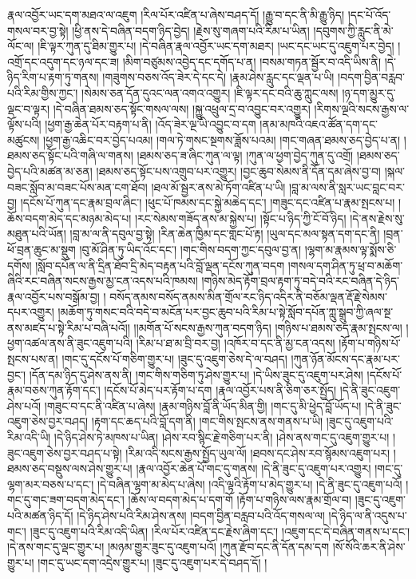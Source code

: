 རྣལ་འབྱོར་ཡང་དག་མཐའ་ལ་འཇུག །རིལ་པོར་འཛིན་པ་ཞེས་བཤད་དོ། །རྒྱུ་བ་དང་ནི་མི་རྒྱུ་ཉིད། །དང་པོ་འོད་གསལ་བར་བྱ་སྟེ། །ཕྱི་ནས་དེ་བཞིན་བདག་ཉིད་བྱེད། །རྗེས་སུ་གཞག་པའི་རིམ་པ་ཡིན། །དབུགས་ཀྱི་རླུང་ནི་མེ་ལོང་ལ། །ཇི་ལྟར་ཀུན་དུ་ཐིམ་གྱུར་པ། །དེ་བཞིན་རྣལ་འབྱོར་ཡང་དག་མཐར། །ཡང་དང་ཡང་དུ་འཇུག་པར་བྱེད། །འགྲོ་དང་འདུག་དང་ཉལ་དང་ཟ། །མིག་བཙུམས་འབྱེད་དང་དགོད་པ་ན། །བསམ་གཏན་སྦྱོར་བ་འདི་ཡིས་ནི། །དེ་ཉིད་རིག་པ་རྟག་ཏུ་གནས། །གཟུགས་བཅས་འོད་ཟེར་དེ་དང་དེ། །རྣམ་ཤེས་རླུང་དང་ལྡན་པ་ཡི། །བདག་བྱིན་བརླབ་པའི་རིམ་གྱིས་ཀྱང་། །སེམས་ཅན་དོན་དུའང་ལན་འགའ་འགྱུར། །ཇི་ལྟར་དང་བའི་ཆུ་ཀླུང་ལས། །ཉ་དག་མྱུར་དུ་ལྡང་བ་ལྟར། །དེ་བཞིན་ཐམས་ཅད་སྟོང་གསལ་ལས། །སྐྱུ་འཕྲུལ་དྲ་བ་འབྱུང་བར་འགྱུར། །རིགས་ལྔའི་སངས་རྒྱས་ལ་ལྟོས་པའི། །ཕྱག་རྒྱ་ཆེན་པོར་བརྟག་པ་ནི། །འོད་ཟེར་ལྔ་ཡི་འབྱུང་བ་དག །ནམ་མཁའི་འཇའ་ཚོན་དག་དང་མཚུངས། །ཕྱག་རྒྱ་འཆིང་བར་བྱེད་པའམ། །གལ་ཏེ་གསང་སྔགས་ཟློས་པའམ། །གང་གཞན་ཐམས་ཅད་བྱེད་པ་ན། །ཐམས་ཅད་སྟོང་པའི་གཞི་ལ་གནས། །ཐམས་ཅད་ཟ་ཞིང་ཀུན་ལ་ལྟ། །ཀུན་ལ་ཕྱག་བྱེད་ཀུན་དུ་འགྲོ། །ཐམས་ཅད་བྱེད་པའི་མཚན་མ་ཅན། །ཐམས་ཅད་སྟོང་པས་འགྲུབ་པར་འགྱུར། །བྱང་ཆུབ་སེམས་ནི་དོན་དམ་ཞེས་བྱ་བ། །སྐལ་བཟང་སློབ་མ་བཟང་པོས་མན་ངག་ཐོབ། །ཐལ་མོ་སྦྱར་ནས་མེ་ཏོག་འཛིན་པ་ཡི། །བླ་མ་ལས་ནི་སླར་ཡང་བླང་བར་བྱ། །དངོས་པོ་ཀུན་དང་རྣམ་བྲལ་ཞིང་། །ཕུང་པོ་ཁམས་དང་སྐྱེ་མཆེད་དང་། །གཟུང་དང་འཛིན་པ་རྣམ་སྤངས་པ། །ཆོས་བདག་མེད་དང་མཉམ་མེད་པ། །རང་སེམས་གཟོད་ནས་མ་སྐྱེས་པ། །སྟོང་པ་ཉིད་ཀྱི་ངོ་བོ་ཉིད། །དེ་ནས་རྗེས་སུ་མཐུན་པའི་ཡོན། །བླ་མ་ལ་ནི་དབུལ་བྱ་སྟེ། །རིན་ཆེན་ཁྱིམ་དང་གླང་པོ་རྟ། །ཡུལ་དང་མལ་སྟན་དག་དང་ནི། །བྲན་ཕོ་བྲན་ཆུང་མ་སྡུག །བུ་མོ་ཤིན་ཏུ་ཡིད་འོང་དང་། །གང་གིས་བདག་ཀྱང་དབུལ་བྱ་ན། །ལྷག་མ་རྣམས་ལྟ་སྨོས་ཅི་དགོས། །སློབ་དཔོན་ལ་ནི་དྲིན་ཐོབ་དྲི་མེད་བརྟན་པའི་བློ་ལྡན་དངོས་ཀུན་བདག །གསལ་དག་ཤིན་ཏུ་ཕྲ་བ་མཆོག་ཞིའི་རང་བཞིན་སངས་རྒྱས་མྱ་ངན་འདས་པའི་ཁམས། །གཉིས་མེད་རྟོག་བྲལ་རྟག་ཏུ་བདེ་བའི་རང་བཞིན་དེ་ཉིད་རྣལ་འབྱོར་པས་བསྒོམ་བྱ། །
བསོད་ནམས་བསོད་ནམས་མིན་གྲོལ་རང་ཉིད་འདིར་ནི་བཅོམ་ལྡན་རྡོ་རྗེ་སེམས་དཔར་འགྱུར། །མཆོག་ཏུ་གསང་བའི་བདེ་བ་མངོན་པར་བྱང་ཆུབ་པའི་རིམ་པ་སྟེ་སློབ་དཔོན་ཀླུ་སྒྲུབ་ཀྱི་ཞལ་སྔ་ནས་མཛད་པ་སྟེ་རིམ་པ་བཞི་པའོ།། །།མགོན་པོ་སངས་རྒྱས་ཀུན་བདག་ཉིད། །གཉིས་པ་ཐམས་ཅད་རྣམ་སྤངས་ལ། །ཕྱག་འཚལ་ནས་ནི་ཟུང་འཇུག་པའི། །རིམ་པ་ཐ་མ་བྲི་བར་བྱ། །འཁོར་བ་དང་ནི་མྱ་ངན་འདས། །རྟོག་པ་གཉིས་པོ་སྤངས་པས་ན། །གང་དུ་དངོས་པོ་གཅིག་གྱུར་པ། །ཟུང་དུ་འཇུག་ཅེས་དེ་ལ་བཤད། །ཀུན་ཉོན་མོངས་དང་རྣམ་པར་བྱང་། །དོན་དམ་ཉིད་དུ་ཤེས་ནས་ནི། །གང་གིས་གཅིག་ཏུ་ཤེས་གྱུར་པ། །དེ་ཡིས་ཟུང་དུ་འཇུག་པར་ཤེས། །དངོས་པོ་རྣམ་བཅས་ཀུན་རྟོག་དང་། །དངོས་པོ་མེད་པར་རྟོག་པ་དག །རྣལ་འབྱོར་པས་ནི་ཅིག་ཅར་སྤྱོད། །དེ་ནི་ཟུང་འཇུག་ཤེས་པའོ། །གཟུང་བ་དང་ནི་འཛིན་པ་ཞེས། །རྣམ་གཉིས་བློ་ནི་ཡོད་མིན་གྱི། །གང་དུ་མི་ཕྱེད་བློ་ཡོད་པ། །དེ་ནི་ཟུང་འཇུག་ཅེས་བྱར་བཤད། །རྟག་དང་ཆད་པའི་བློ་དག་ནི། །གང་གིས་སྤངས་ནས་གནས་པ་ཡི། །ཟུང་དུ་འཇུག་པའི་རིམ་འདི་ཡི། །དེ་ཉིད་ཤེས་ཏེ་མཁས་པ་ཡིན། །ཤེས་རབ་སྙིང་རྗེ་གཅིག་པར་ནི། །ཤེས་ནས་གང་དུ་འཇུག་གྱུར་པ། །ཟུང་འཇུག་ཅེས་བྱར་བཤད་པ་སྟེ། །རིམ་འདི་སངས་རྒྱས་སྤྱོད་ཡུལ་ལོ། །ཐབས་དང་ཤེས་རབ་སྙོམས་འཇུག་པར། །ཐམས་ཅད་བསྡུས་ལས་ཤེས་གྱུར་པ། །རྣལ་འབྱོར་ཆེན་པོ་གང་དུ་གནས། །དེ་ནི་ཟུང་དུ་འཇུག་པར་འགྱུར། །གང་དུ་ལྷག་མར་བཅས་པ་དང་། །དེ་བཞིན་ལྷག་མ་མེད་པ་ཞེས། །འདི་ལྟའི་རྟོག་པ་མེད་གྱུར་པ། །དེ་ནི་ཟུང་དུ་འཇུག་པའོ། །གང་དུ་གང་ཟག་བདག་མེད་དང་། །ཆོས་ལ་བདག་མེད་པ་དག་གོ །རྟོག་པ་གཉིས་ལས་རྣམ་གྲོལ་བ། །ཟུང་དུ་འཇུག་པའི་མཚན་ཉིད་དོ། །དེ་ཉིད་ཤེས་པའི་རིམ་ཤེས་ནས། །བདག་བྱིན་བརླབ་པའི་འོད་གསལ་ལ། །དེ་ཉིད་ལ་ནི་འདུས་པ་གང་། །ཟུང་དུ་འཇུག་པའི་རིམ་འདི་ཡིན། །རིལ་པོར་འཛིན་དང་རྗེས་ཞིག་དང་། །འཇུག་དང་དེ་བཞིན་གནས་པ་དང་། །དེ་ནས་གང་དུ་ལྡང་གྱུར་པ། །མཉམ་གྱུར་ཟུང་དུ་འཇུག་པའོ། །ཀུན་རྫོབ་དང་ནི་དོན་དམ་དག །སོ་སོའི་ཆར་ནི་ཤེས་གྱུར་པ། །གང་དུ་ཡང་དག་འདྲེས་གྱུར་པ། །ཟུང་དུ་འཇུག་པར་དེ་བཤད་དོ། །
